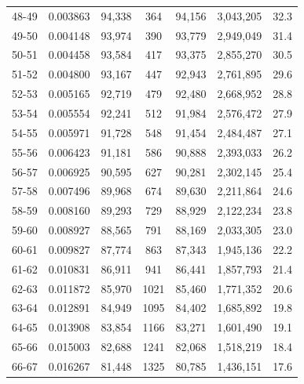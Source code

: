 \documentclass[10pt,a4paper]{article}
\begin{document}
\begin{longtable}{|c|c|c|c|c|c|c|}
48-49  & 0.003863      & 94,338       & 364           & 94,156        & 3,043,205    & 32.3         \\
49-50  & 0.004148      & 93,974       & 390           & 93,779        & 2,949,049    & 31.4         \\
50-51  & 0.004458      & 93,584       & 417           & 93,375        & 2,855,270    & 30.5         \\
51-52  & 0.004800      & 93,167       & 447           & 92,943        & 2,761,895    & 29.6         \\
52-53  & 0.005165      & 92,719       & 479           & 92,480        & 2,668,952    & 28.8         \\
53-54  & 0.005554      & 92,241       & 512           & 91,984        & 2,576,472    & 27.9         \\
54-55  & 0.005971      & 91,728       & 548           & 91,454        & 2,484,487    & 27.1         \\
55-56  & 0.006423      & 91,181       & 586           & 90,888        & 2,393,033    & 26.2         \\
56-57  & 0.006925      & 90,595       & 627           & 90,281        & 2,302,145    & 25.4         \\
57-58  & 0.007496      & 89,968       & 674           & 89,630        & 2,211,864    & 24.6         \\
58-59  & 0.008160      & 89,293       & 729           & 88,929        & 2,122,234    & 23.8         \\
59-60  & 0.008927      & 88,565       & 791           & 88,169        & 2,033,305    & 23.0         \\
60-61  & 0.009827      & 87,774       & 863           & 87,343        & 1,945,136    & 22.2         \\
61-62  & 0.010831      & 86,911       & 941           & 86,441        & 1,857,793    & 21.4         \\
62-63  & 0.011872      & 85,970       & 1021          & 85,460        & 1,771,352    & 20.6         \\
63-64  & 0.012891      & 84,949       & 1095          & 84,402        & 1,685,892    & 19.8         \\
64-65  & 0.013908      & 83,854       & 1166          & 83,271        & 1,601,490    & 19.1         \\
65-66  & 0.015003      & 82,688       & 1241          & 82,068        & 1,518,219    & 18.4         \\
66-67  & 0.016267      & 81,448       & 1325          & 80,785        & 1,436,151    & 17.6         \\

\end{longtable}
\end{document}
